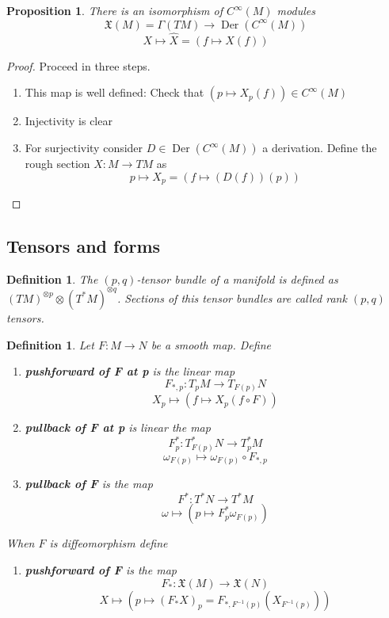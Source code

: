 \documentclass{article}
\numberwithin{theorem}{section}
\newtheorem{proposition}[theorem]{Proposition}
\newtheorem{definition}[theorem]{Definition}
\newcommand{\1}{\mathds{1}}
\DeclareMathOperator{\Der}{Der}
\begin{document}
\begin{proposition}
    There is an isomorphism of $C^\infty(M)$ modules 
    \[ \mathfrak{X}(M) = \Gamma(TM) \to \Der(C^\infty(M))  \]
    \[ X \mapsto \hat{X} = (f \mapsto X(f) )\]
\end{proposition}
\begin{proof}
    Proceed in three steps. 
    \begin{enumerate}
        \item This map is well defined: Check that  $(p \mapsto X_p(f)) \in C^\infty(M)$ 
        \item Injectivity is clear 
        \item For surjectivity consider $D \in \Der(C^\infty(M))$ a derivation. Define the rough section $X: M \to TM$ as 
        \[ p \mapsto X_p = (f \mapsto (D(f))(p))\]
    \end{enumerate}
\end{proof}

\subsection{Tensors and forms}
\begin{definition}
    The $(p,q)$-tensor bundle of a manifold is defined as $(TM)^{\otimes p}\otimes (T^*M)^{\otimes q} $. Sections of this tensor bundles are called rank $(p,q)$ tensors. 
\end{definition}

\begin{definition}
    Let $F: M \to N $ be a smooth map. Define 
    \begin{enumerate}
        \item \textbf{pushforward of F at p} is the linear map 
        \[ F_{*,p} : T_pM \to T_{F(p)}N \]
        \[ X_p \mapsto (f \mapsto X_p(f \circ F))\]
        \item \textbf{pullback of F at p} is linear the map 
        \[ F^*_p : T^*_{F(p)}N \to T^*_pM \]
        \[ \omega_{F(p)} \mapsto \omega_{F(p)} \circ F_{*,p} \]
        \item \textbf{pullback of F} is the map 
        \[ F^* : T^*N \to T^*M \]
        \[ \omega \mapsto (p \mapsto F^*_p \omega_{F(p)} )\]
    \end{enumerate}
    When $F$ is diffeomorphism define 
    \begin{enumerate}
        \item \textbf{pushforward of F} is the map 
        \[ F_* : \mathfrak{X}(M) \to \mathfrak{X}(N) \]
        \[ X \mapsto (p \mapsto (F_* X)_p = F_{*, F^{-1}(p)}(X_{F^{-1}(p)}))\]
    \end{enumerate}
\end{definition}
\end{document}
